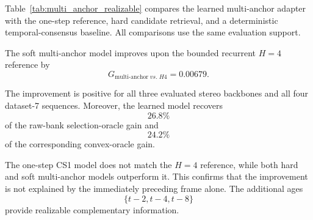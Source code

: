 \documentclass[11pt,a4paper]{article}
\begin{document}
Table~\ref{tab:multi_anchor_realizable} compares the learned multi-anchor adapter with
the one-step reference, hard candidate retrieval, and a deterministic temporal-consensus
baseline. All comparisons use the same evaluation support.

\begin{table}[t]
    \centering
    \caption{Frozen dataset-7 results for the realizable raw multi-anchor experiment.
    Gain versus \(H=4\) is measured against the bounded CODD-style recurrent reference
    on common support.}
    \label{tab:multi_anchor_realizable}
\end{table}

The soft multi-anchor model improves upon the bounded recurrent \(H=4\) reference by
\begin{equation}
    G_{\mathrm{multi\text{-}anchor}\;vs.\;H4}
    =
    0.00679.
\end{equation}

The improvement is positive for all three evaluated stereo backbones and all four
dataset-7 sequences. Moreover, the learned model recovers
\begin{equation}
    26.8\%
\end{equation}
of the raw-bank selection-oracle gain and
\begin{equation}
    24.2\%
\end{equation}
of the corresponding convex-oracle gain.

The one-step CS1 model does not match the \(H=4\) reference, while both hard and soft
multi-anchor models outperform it. This confirms that the improvement is not explained
by the immediately preceding frame alone. The additional ages
\begin{equation}
    \{t-2,t-4,t-8\}
\end{equation}
provide realizable complementary information.
\end{document}
